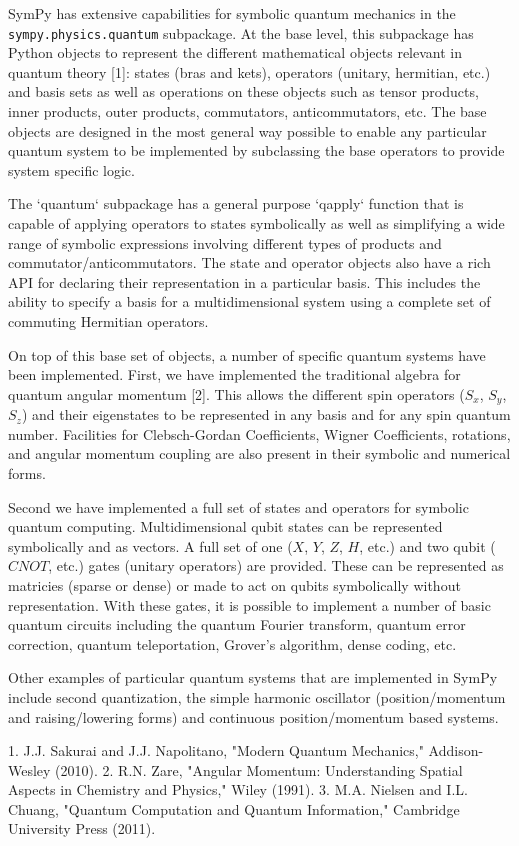 SymPy has extensive capabilities for symbolic quantum mechanics in the
\verb|sympy.physics.quantum| subpackage. At the base level, this subpackage has
Python objects to represent the different mathematical objects relevant in
quantum theory [1]: states (bras and kets), operators (unitary, hermitian,
etc.) and basis sets as well as operations on these objects such as tensor
products, inner products, outer products, commutators, anticommutators, etc.
The base objects are designed in the most general way possible to enable any
particular quantum system to be implemented by subclassing the base operators
to provide system specific logic.

The `quantum` subpackage has a general purpose `qapply` function that is
capable of applying operators to states symbolically as well as simplifying a
wide range of symbolic expressions involving different types of products and
commutator/anticommutators. The state and operator objects also have a rich API
for declaring their representation in a particular basis. This includes the
ability to specify a basis for a multidimensional system using a complete set
of commuting Hermitian operators.

On top of this base set of objects, a number of specific quantum systems have
been implemented. First, we have implemented the traditional algebra for
quantum angular momentum [2]. This allows the different spin operators ($S_x$,
$S_y$, $S_z$) and their eigenstates to be represented in any basis and for any
spin quantum number. Facilities for Clebsch-Gordan Coefficients, Wigner
Coefficients, rotations, and angular momentum coupling are also present in
their symbolic and numerical forms.

Second we have implemented a full set of states and operators for symbolic
quantum computing. Multidimensional qubit states can be represented
symbolically and as vectors. A full set of one ($X$, $Y$, $Z$, $H$, etc.) and
two qubit ($CNOT$, etc.) gates (unitary operators) are provided. These can be
represented as matricies (sparse or dense) or made to act on qubits
symbolically without representation. With these gates, it is possible to
implement a number of basic quantum circuits including the quantum Fourier
transform, quantum error correction, quantum teleportation, Grover's algorithm,
dense coding, etc.

Other examples of particular quantum systems that are implemented in SymPy
include second quantization, the simple harmonic oscillator (position/momentum
and raising/lowering forms) and continuous position/momentum based systems.

1. J.J. Sakurai and J.J. Napolitano, "Modern Quantum Mechanics," Addison-Wesley
(2010).
2. R.N. Zare, "Angular Momentum: Understanding Spatial Aspects in Chemistry and
Physics," Wiley (1991).
3. M.A. Nielsen and I.L. Chuang, "Quantum Computation and Quantum Information,"
Cambridge University Press (2011).

